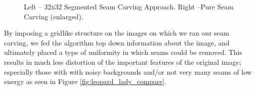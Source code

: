 \documentclass[conference]{acmsiggraph}
\begin{document}
\begin{figure}[ht]       
    \caption{Left -- 32x32 Segmented Seam Carving Approach. Right --Pure Seam Carving (enlarged). }
    \label{fig:orgSeamCarvingComparision}
\end{figure}


By imposing a gridlike structure on the images on which we ran our seam carving, we fed the algorithm top down information about the image, and ultimately placed a type of uniformity in which seams could be removed. This results in much less distortion of the important features of the original image; especially those with with noisy backgrounds and/or not very many seams of low energy as seen in Figure \ref{fig:leopard_lady_compare}.
\end{document}
